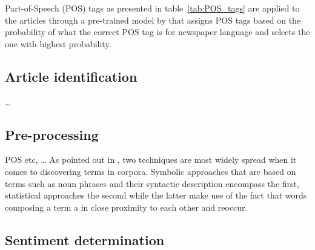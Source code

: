 
Part-of-Speech (POS) tags as presented in table~\vref{tab:POS_tags} are applied to the articles through a pre-trained model by \textcite{OpenNLP.2016} that assigns POS tags based on the probability of what the correct POS tag is for newspaper language and selects the one with highest probability.



\subsection{Article identification}

\dots 



\subsection{Pre-processing}
POS etc, \dots
As pointed out in \textcite{Hu.2004}, two techniques are most widely spread when it comes to discovering terms in corpora. Symbolic approaches that are based on terms such as noun phrases and their syntactic description encompass the first, statistical approaches the second while the latter make use of the fact that words composing a term a in close proximity to each other and reoccur. 


\subsection{Sentiment determination}

